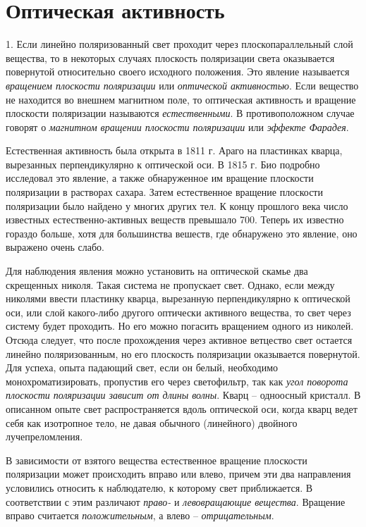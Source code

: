 \documentclass[14pt]{article}
\begin{document}
\newpage

\setcounter{equation}{0}
\setcounter{figure}{0}

\section{Оптическая активность}

1. Если линейно поляризованный свет проходит через плоскопараллельный слой вещества, то в некоторых случаях плоскость поляризации света оказывается повернутой относительно
своего исходного положения. Это явление называется \textsl{вращением плоскости поляризации} или \textsl{оптической активностью}. Если вещество не находится во внешнем магнитном поле, то оптическая активность и вращение плоскости поляризации называются \textsl{естественными}. В противоположном случае говорят о \textsl{магнитном вращении плоскости поляризации} или \textsl{эффекте Фарадея}.

Естественная активность была открыта в 1811 г. Араго на пластинках кварца, вырезанных перпендикулярно к оптической оси. В 1815 г. Био подробно исследовал это явление, а также обнаруженное им вращение плоскости поляризации в растворах сахара. Затем естественное вращение плоскости поляризации было найдено у многих других тел. К концу прошлого века число известных естественно-активных веществ превышало 700. Теперь их известно гораздо больше, хотя для большинства вешеств, где обнаружено это явление, оно выражено очень слабо.

Для наблюдения явления можно установить на оптической скамье два скрещенных николя. Такая система не пропускает свет. Однако, если между николями ввести пластинку кварца, вырезанную перпендикулярно к оптической оси, или слой какого-либо другого оптически активного вещества, то свет через систему будет проходить. Но его можно погасить вращением одного из николей. Отсюда следует, что после прохождения через активное ветцество свет остается линейно поляризованным, но его плоскость поляризации оказывается повернутой. Для успеха, опыта падающий свет, если он белый, необходимо монохроматизировать, пропустив его через светофильтр, так как \textsl{угол поворота плоскости поляризации зависит от длины волны}. Кварц -- одноосный кристалл. В описанном опыте свет распространяется вдоль оптической оси, когда кварц ведет себя как изотропное тело, не давая обычного (линейного) двойного лучепреломления.

В зависимости от взятого вещества естественное вращение плоскости поляризации может происходить вправо или влево, причем эти два направления условились относить к наблюдателю, к которому свет приближается. В соответствии с этим различают \textsl{право-} и \textsl{левовращающие вещества}. Вращение вправо считается \textsl{положительным}, а влево -- \textsl{отрицательным}.
\end{document}
